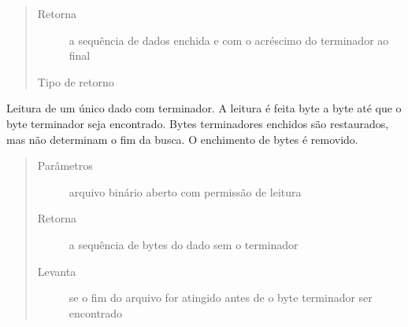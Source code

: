 \documentclass[letterpaper,10pt,brazil]{sphinxmanual}
\begin{document}
\begin{fulllineitems}
\begin{fulllineitems}
\begin{quote}
\begin{description}
\item[{Retorna}] \leavevmode
\sphinxAtStartPar
a sequência de dados enchida e com o acréscimo do terminador
ao final

\item[{Tipo de retorno}] \leavevmode
\sphinxAtStartPar
{}

\end{description}\end{quote}

\end{fulllineitems}


\begin{fulllineitems}
\label{\detokenize{estrutarq.dado:estrutarq.dado.DadoTerminador.leia_de_arquivo}}
\pysigstartsignatures
{}
\pysigstopsignatures
\sphinxAtStartPar
Leitura de um único dado com terminador. A leitura é feita byte a
byte até que o byte terminador seja encontrado. Bytes terminadores
enchidos são restaurados, mas não determinam o fim da busca. O
enchimento de bytes é removido.
\begin{quote}\begin{description}
\item[{Parâmetros}] \leavevmode
\sphinxAtStartPar
{} \textendash{} arquivo binário aberto com permissão de leitura

\item[{Retorna}] \leavevmode
\sphinxAtStartPar
a sequência de bytes do dado sem o terminador

\item[{Levanta}] \leavevmode
\sphinxAtStartPar
{} \textendash{} se o fim do arquivo for atingido antes de o byte
terminador ser encontrado

\end{description}\end{quote}


\end{fulllineitems}
\end{fulllineitems}
\end{document}
